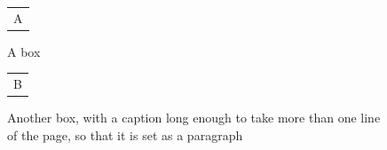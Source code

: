 \documentclass{article}
\begin{document}
\begin{figure}[h]
\centering
\begin{tabular}{c}A\end{tabular}
\caption{A box}
\end{figure}
\begin{figure}[h]
\centering
\begin{tabular}{c}B\end{tabular}
\caption{Another box, with a caption long enough to take more than one line of the page, so that it is set as a paragraph}
\end{figure}
\end{document}
